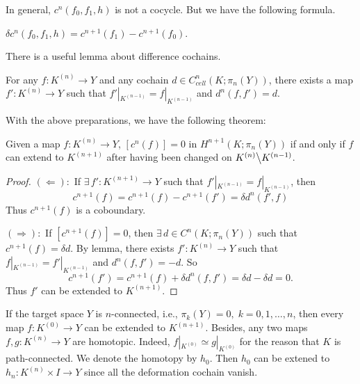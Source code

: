 In general, $c^n(f_0,f_1,h)$ is not a cocycle. But we have the following
formula. 
\begin{theorem}
    $\delta c^n(f_0,f_1,h) = c^{n+1}(f_1) - c^{n+1}(f_0)$.
\end{theorem} 

There is a useful lemma about difference cochains.
\begin{lemma}
    For any $f:K^{(n)}\to Y$ and any cochain $d\in C^n_{cell}(K;\pi_n(Y))$, 
    there exists a map $f':K^{(n)}\to Y$ such that 
    $f'|_{K^{(n-1)}} = f|_{K^{(n-1)}}$ and $d^n(f,f') = d$.
\end{lemma}

With the above preparations, we have the following theorem:
\begin{theorem}[Eilenberg]
    Given a map $f:K^{(n)}\to Y$, $[c^n(f)] = 0$ in 
    $H^{n+1}(K;\pi_n(Y))$ if and only if $f$ can extend to $K^{(n+1)}$ 
    after having been changed on $K^{(n)}\big\backslash K^{(n-1)}$.
\end{theorem}
\begin{proof}
    $(\Leftarrow):$ If $\exists\,f':K^{(n+1)}\to Y$ such that 
    $f'|_{K^{(n-1)}} = f|_{K^{(n-1)}}$, then 
    \begin{equation*}
        c^{n+1}(f) = c^{n+1}(f) - c^{n+1}(f') = \delta d^n(f',f)
    \end{equation*}
    Thus $c^{n+1}(f)$ is a coboundary. 

    $(\Rightarrow):$ If  $[c^{n+1}(f)]=0$, then $\exists\,d\in C^n(K;\pi_n(Y))$ 
    such that $c^{n+1}(f) = \delta d$. By lemma, there exists 
    $f':K^{(n)}\to Y$ such that $f|_{K^{(n-1)}} = f'|_{K^{(n-1)}}$ and 
    $d^n(f,f') = -d$. So 
    \begin{equation*}
        c^{n+1}(f') = c^{n+1}(f) + \delta d^n(f,f') = \delta d - \delta d = 0.
    \end{equation*}
    Thus $f'$ can be extended to $K^{(n+1)}$.
\end{proof}

\begin{example}
    If the target space $Y$ is $n$-connected, i.e., 
    $\pi_k(Y)=0,\; k=0,1,\dots,n$, then every map $f:K^{(0)}\to Y$ can be 
    extended to $K^{(n+1)}$. Besides, any two maps $f,g:K^{(n)}\to Y$ are 
    homotopic. Indeed, $f|_{K^{(0)}}\simeq g|_{K^{(0)}}$ for the reason that 
    $K$ is path-connected. We denote the homotopy by $h_0$. Then $h_0$ can 
    be extened to $h_n:K^{(n)}\times I\to Y$ since all the deformation cochain 
    vanish.
\end{example}

